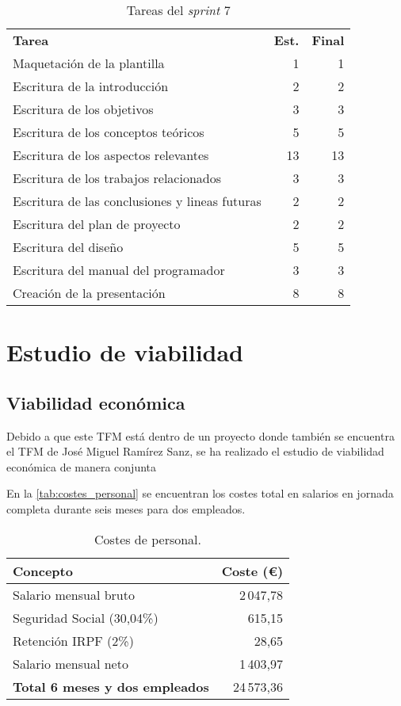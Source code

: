 \begin{table}[H]
	\begin{tabularx}{\linewidth}{X r r}
		\toprule \textbf{Tarea} & \textbf{Est.} & \textbf{Final}\\
		\otoprule
		Maquetación de la plantilla & 1 & 1\\
		Escritura de la introducción & 2 & 2\\
		Escritura de los objetivos & 3 & 3\\
		Escritura de los conceptos teóricos & 5 & 5\\
		Escritura de los aspectos relevantes & 13 & 13\\
		Escritura de los trabajos relacionados & 3 & 3\\
		Escritura de las conclusiones y lineas futuras & 2 & 2\\
		Escritura del plan de proyecto & 2 & 2\\
		Escritura del diseño & 5 & 5\\
		Escritura del manual del programador & 3 & 3\\
		Creación de la presentación & 8 & 8\\  
		\bottomrule
	\end{tabularx}
	\caption{Tareas del \textit{sprint} 7}
	\label{tab:sprint7}
\end{table}


\section{Estudio de viabilidad}


\subsection{Viabilidad económica}

Debido a que este TFM está dentro de un proyecto donde también se encuentra el TFM de José Miguel Ramírez Sanz, se ha realizado el estudio de viabilidad económica de manera conjunta


En la \autoref{tab:costes_personal} se encuentran los costes total en salarios en jornada completa durante seis meses para dos empleados.

\begin{table}[H]\centering
	\begin{tabular}[]{@{}l r@{}}
		\toprule
		\textbf{Concepto} & \textbf{Coste (\euro{})} \\
		\midrule
		Salario mensual bruto~\cite{salariales} & 2\,047,78 \\
		Seguridad Social (30,04\%) & 615,15 \\
		Retención IRPF (2\%) & 28,65 \\
		Salario mensual neto & 1\,403,97 \\\hubu
		\textbf{Total 6 meses y dos empleados} &  24\,573,36 \\
		\bottomrule
	\end{tabular}
	\caption{Costes de personal.}
	\label{tab:costes_personal}
\end{table}

